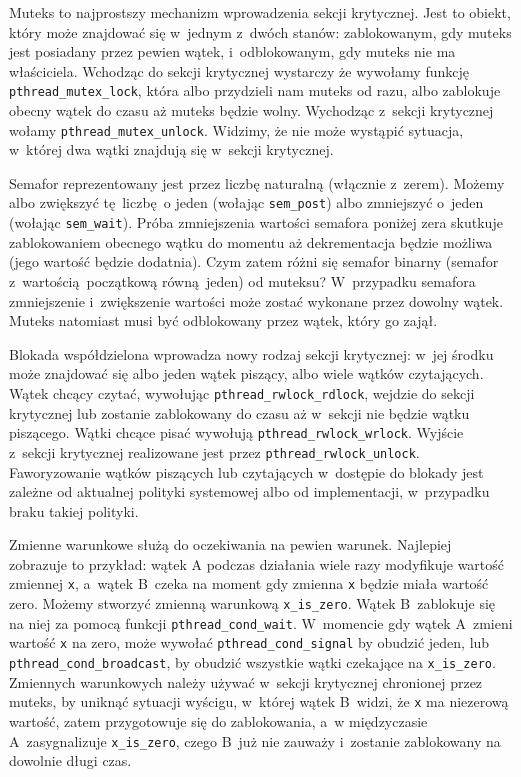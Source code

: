 \documentclass[shortabstract]{iithesis}
\theoremstyle{definition} \newtheorem*{definition}{Definicja}
\theoremstyle{definition} \newtheorem*{example}{Przykład}
\theoremstyle{definition} \newtheorem*{remark}{Uwaga}
\begin{document}
Muteks to najprostszy mechanizm wprowadzenia sekcji krytycznej. Jest to obiekt, który może znajdować się
w~jednym z~dwóch stanów: zablokowanym, gdy muteks jest posiadany przez pewien wątek, i~odblokowanym,
gdy muteks nie ma właściciela. Wchodząc do sekcji krytycznej wystarczy że wywołamy funkcję
\texttt{pthread\_mutex\_lock}, która albo przydzieli nam muteks od razu, albo zablokuje obecny wątek do czasu aż
muteks będzie wolny. Wychodząc z~sekcji krytycznej wołamy \texttt{pthread\_mutex\_unlock}. Widzimy, że
nie może wystąpić sytuacja, w~której dwa wątki znajdują się w~sekcji krytycznej.

Semafor reprezentowany jest przez liczbę naturalną (włącznie z~zerem). Możemy albo zwiększyć tę liczbę o jeden
(wołając \texttt{sem\_post}) albo zmniejszyć o~jeden (wołając \texttt{sem\_wait}).
Próba zmniejszenia wartości semafora poniżej zera skutkuje zablokowaniem
obecnego wątku do momentu aż dekrementacja będzie możliwa (jego wartość będzie dodatnia).
Czym zatem różni się semafor binarny (semafor z~wartością początkową równą jeden) od muteksu?
W~przypadku semafora zmniejszenie i~zwiększenie wartości może zostać
wykonane przez dowolny wątek. Muteks natomiast musi być odblokowany przez wątek, który go zajął.

Blokada współdzielona wprowadza nowy rodzaj sekcji krytycznej:
w~jej środku może znajdować się albo jeden wątek piszący, albo wiele wątków czytających.
Wątek chcący czytać, wywołując \texttt{pthread\_rwlock\_rdlock}, wejdzie do sekcji krytycznej lub zostanie zablokowany
do czasu aż w~sekcji nie będzie wątku piszącego. Wątki
chcące pisać wywołują \texttt{pthread\_rwlock\_wrlock}. Wyjście z~sekcji krytycznej realizowane jest przez
\texttt{pthread\_rwlock\_unlock}. Faworyzowanie wątków piszących lub czytających w~dostępie do blokady
jest zależne od aktualnej polityki systemowej albo od implementacji, w~przypadku braku takiej polityki.

Zmienne warunkowe służą do oczekiwania na pewien warunek. Najlepiej zobrazuje to przykład: wątek A
podczas działania wiele razy modyfikuje wartość zmiennej \texttt{x}, a~wątek B~czeka na moment gdy zmienna \texttt{x}
będzie miała wartość zero. Możemy stworzyć zmienną warunkową \texttt{x\_is\_zero}. Wątek B~zablokuje się na niej
za pomocą funkcji \texttt{pthread\_cond\_wait}. W~momencie gdy wątek A~zmieni wartość \texttt{x} na zero,
może wywołać \texttt{pthread\_cond\_signal} by obudzić jeden, lub \texttt{pthread\_cond\_broadcast}, by obudzić
wszystkie wątki czekające na \texttt{x\_is\_zero}. Zmiennych warunkowych należy używać w~sekcji krytycznej
chronionej przez muteks, by uniknąć sytuacji wyścigu, w~której wątek B~widzi, że \texttt{x} ma niezerową
wartość, zatem przygotowuje się do zablokowania, a~w międzyczasie A~zasygnalizuje \texttt{x\_is\_zero},
czego B~już nie zauważy i~zostanie zablokowany na dowolnie długi czas.
\end{document}
